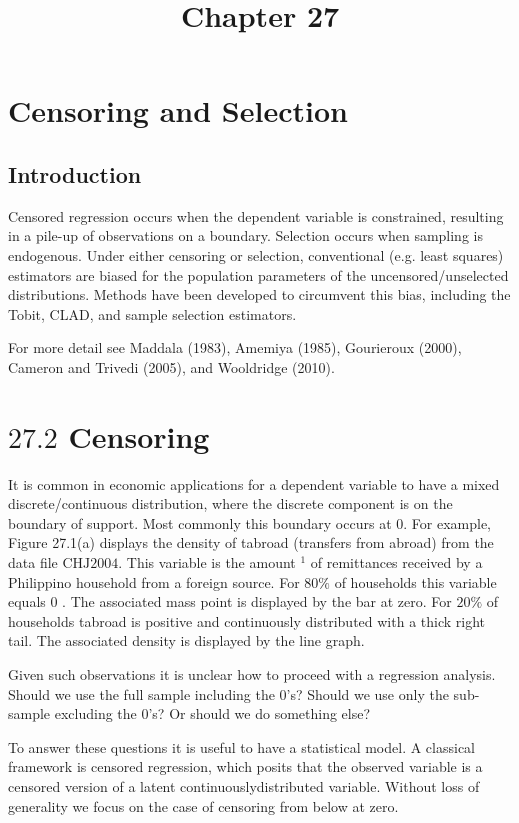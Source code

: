 \documentclass[10pt]{article}
\title{Chapter 27 }
\author{}
\date{}
\begin{document}
\maketitle
\section{Censoring and Selection}
\subsection{Introduction}
Censored regression occurs when the dependent variable is constrained, resulting in a pile-up of observations on a boundary. Selection occurs when sampling is endogenous. Under either censoring or selection, conventional (e.g. least squares) estimators are biased for the population parameters of the uncensored/unselected distributions. Methods have been developed to circumvent this bias, including the Tobit, CLAD, and sample selection estimators.

For more detail see Maddala (1983), Amemiya (1985), Gourieroux (2000), Cameron and Trivedi (2005), and Wooldridge (2010).

\section{$27.2$ Censoring}
It is common in economic applications for a dependent variable to have a mixed discrete/continuous distribution, where the discrete component is on the boundary of support. Most commonly this boundary occurs at 0. For example, Figure 27.1(a) displays the density of tabroad (transfers from abroad) from the data file $\mathrm{CH} \mathrm{J} 2004$. This variable is the amount ${ }^{1}$ of remittances received by a Philippino household from a foreign source. For $80 \%$ of households this variable equals 0 . The associated mass point is displayed by the bar at zero. For $20 \%$ of households tabroad is positive and continuously distributed with a thick right tail. The associated density is displayed by the line graph.

Given such observations it is unclear how to proceed with a regression analysis. Should we use the full sample including the 0's? Should we use only the sub-sample excluding the 0's? Or should we do something else?

To answer these questions it is useful to have a statistical model. A classical framework is censored regression, which posits that the observed variable is a censored version of a latent continuouslydistributed variable. Without loss of generality we focus on the case of censoring from below at zero.
\end{document}
